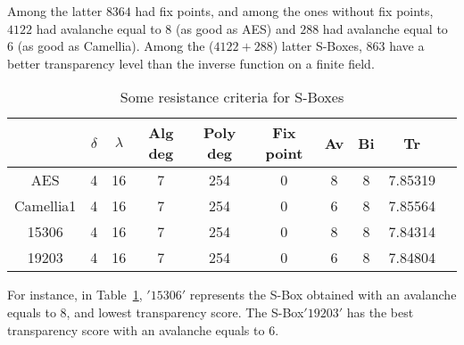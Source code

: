 \documentclass{article}\usepackage{amsthm}
\newcommand{\SBox}{S-Box\xspace}
\newcommand{\SBoxes}{S-Boxes\xspace}
\begin{document}
Among the latter $8364$ had fix points, and among the ones without fix points,
$4122$ had avalanche equal to $8$ (as good as AES) and $288$ had avalanche
equal to $6$ (as good as Camellia).
Among the ($4122+288$) latter \SBoxes, $863$ have a better transparency level than the inverse function on
a finite field. \\




\begin{table}[htb]\center
\begin{tabular}{|c|c|c|c|c|c|c|c|c|c|}
  \hline 
  & $\delta $ &  $\lambda $ & Alg deg & Poly deg & 
  Fix point & Av & Bi &  Tr \\
  \hline
  AES & 4 & 16 & 7 & 254 & 0 & 8 & 8  & 7.85319 \\
  Camellia1 & 4 & 16 & 7 & 254 & 0 & 6 & 8 & 7.85564 \\
  15306 & 4 & 16 & 7 & 254 & 0 & 8 & 8 & 7.84314 \\
  19203 & 4 & 16 & 7 & 254 & 0 & 6 & 8 & 7.84804 \\
  \hline
\end{tabular}
\caption{Some resistance criteria for \SBoxes}\label{tab:critbox}
\end{table}

For instance, in Table~\ref{tab:critbox}, $'15306'$ represents the \SBox obtained with an avalanche equals to $8$, and
lowest transparency score. The \SBox $'19203'$ has the best transparency score
with an avalanche equals to 6. \\
\end{document}
